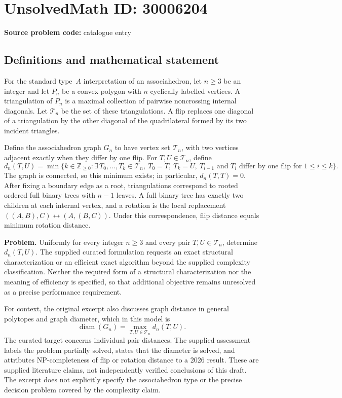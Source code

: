 \documentclass[11pt]{article}
\newcommand{\Z}{\mathbb{Z}}
\begin{document}
\section*{UnsolvedMath ID: 30006204}
\textbf{Source problem code:} catalogue entry
\subsection{Definitions and mathematical statement}
For the standard type~\(A\) interpretation of an associahedron, let \(n\geq 3\) be an integer and let \(P_n\) be a convex polygon with \(n\) cyclically labelled vertices. A triangulation of \(P_n\) is a maximal collection of pairwise noncrossing internal diagonals. Let \(\mathcal T_n\) be the set of these triangulations. A flip replaces one diagonal of a triangulation by the other diagonal of the quadrilateral formed by its two incident triangles.

Define the associahedron graph \(G_n\) to have vertex set \(\mathcal T_n\), with two vertices adjacent exactly when they differ by one flip. For \(T,U\in\mathcal T_n\), define
\[
d_n(T,U)=\min\bigl\{k\in\Z_{\geq 0}:\exists\,T_0,\ldots,T_k\in\mathcal T_n,\ T_0=T,\ T_k=U,\ T_{i-1}\text{ and }T_i\text{ differ by one flip for }1\leq i\leq k\bigr\}.
\]
The graph is connected, so this minimum exists; in particular, \(d_n(T,T)=0\). After fixing a boundary edge as a root, triangulations correspond to rooted ordered full binary trees with \(n-1\) leaves. A full binary tree has exactly two children at each internal vertex, and a rotation is the local replacement \(((A,B),C)\leftrightarrow(A,(B,C))\). Under this correspondence, flip distance equals minimum rotation distance.

\textbf{Problem.} Uniformly for every integer \(n\geq 3\) and every pair \(T,U\in\mathcal T_n\), determine \(d_n(T,U)\). The supplied curated formulation requests an exact structural characterization or an efficient exact algorithm beyond the supplied complexity classification. Neither the required form of a structural characterization nor the meaning of efficiency is specified, so that additional objective remains unresolved as a precise performance requirement.

For context, the original excerpt also discusses graph distance in general polytopes and graph diameter, which in this model is
\[
\operatorname{diam}(G_n)=\max_{T,U\in\mathcal T_n}d_n(T,U).
\]
The curated target concerns individual pair distances. The supplied assessment labels the problem partially solved, states that the diameter is solved, and attributes NP-completeness of flip or rotation distance to a 2026 result. These are supplied literature claims, not independently verified conclusions of this draft. The excerpt does not explicitly specify the associahedron type or the precise decision problem covered by the complexity claim.
\end{document}

